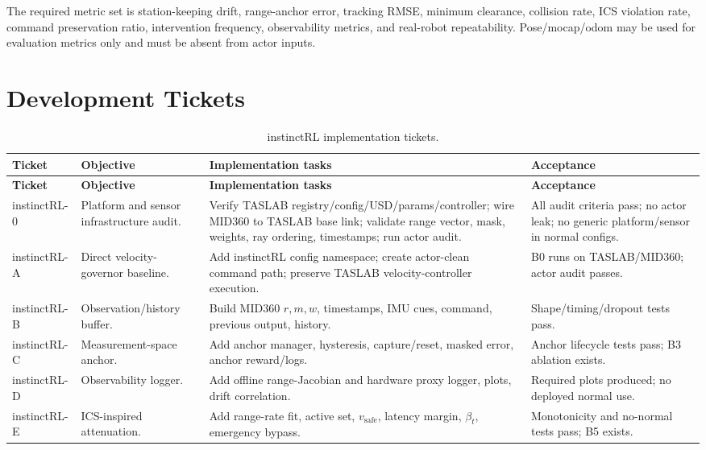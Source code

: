 \documentclass[11pt]{article}
\newcommand{\vsafe}{v_{\mathrm{safe}}}
\begin{document}
The required metric set is station-keeping drift, range-anchor error, tracking
RMSE, minimum clearance, collision rate, ICS violation rate, command
preservation ratio, intervention frequency, observability metrics, and
real-robot repeatability. Pose/mocap/odom may be used for evaluation metrics
only and must be absent from actor inputs.

\section{Development Tickets}

\begin{longtable}{@{}L{0.14\textwidth}L{0.18\textwidth}L{0.38\textwidth}L{0.20\textwidth}@{}}
\caption{instinctRL implementation tickets.}\\
\toprule
\textbf{Ticket} & \textbf{Objective} & \textbf{Implementation tasks} & \textbf{Acceptance} \\
\midrule
\endfirsthead
\toprule
\textbf{Ticket} & \textbf{Objective} & \textbf{Implementation tasks} & \textbf{Acceptance} \\
\midrule
\endhead
instinctRL-0 & Platform and sensor infrastructure audit. & Verify TASLAB registry/config/USD/params/controller; wire MID360 to TASLAB base link; validate range vector, mask, weights, ray ordering, timestamps; run actor audit. & All audit criteria pass; no actor leak; no generic platform/sensor in normal configs. \\
instinctRL-A & Direct velocity-governor baseline. & Add instinctRL config namespace; create actor-clean command path; preserve TASLAB velocity-controller execution. & B0 runs on TASLAB/MID360; actor audit passes. \\
instinctRL-B & Observation/history buffer. & Build MID360 \(r,m,w\), timestamps, IMU cues, command, previous output, history. & Shape/timing/dropout tests pass. \\
instinctRL-C & Measurement-space anchor. & Add anchor manager, hysteresis, capture/reset, masked error, anchor reward/logs. & Anchor lifecycle tests pass; B3 ablation exists. \\
instinctRL-D & Observability logger. & Add offline range-Jacobian and hardware proxy logger, plots, drift correlation. & Required plots produced; no deployed normal use. \\
instinctRL-E & ICS-inspired attenuation. & Add range-rate fit, active set, \(\vsafe\), latency margin, \(\beta_t\), emergency bypass. & Monotonicity and no-normal tests pass; B5 exists. \\

\end{longtable}
\end{document}
